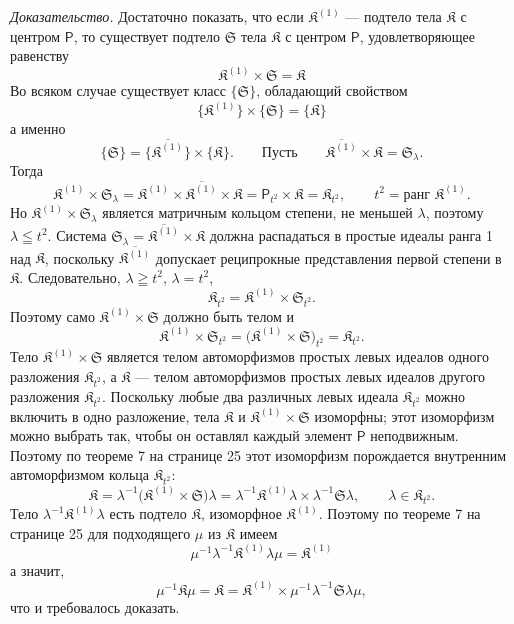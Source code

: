 \documentclass[11pt]{article}
\begin{document}
\emph{Доказательство.} Достаточно показать, что если \(\mathfrak K^{(1)}\) --- подтело тела \(\mathfrak K\) с центром \(\mathsf P\), то существует подтело \(\mathfrak S\) тела \(\mathfrak K\) с центром \(\mathsf P\), удовлетворяющее равенству
\[
\mathfrak K^{(1)}\times\mathfrak S=\mathfrak K
\]
Во всяком случае существует класс \(\{\mathfrak S\}\), обладающий свойством
\[
\{\mathfrak K^{(1)}\}\times\{\mathfrak S\}=\{\mathfrak K\}
\]
а именно
\[
\{\mathfrak S\}=\{\overline{\mathfrak K^{(1)}}\}\times\{\mathfrak K\}.
\qquad
\text{Пусть}\qquad
\overline{\mathfrak K^{(1)}}\times\mathfrak K=\mathfrak S_\lambda.
\]
Тогда
\[
\mathfrak K^{(1)}\times\mathfrak S_\lambda
=\mathfrak K^{(1)}\times\overline{\mathfrak K^{(1)}}\times\mathfrak K
=\mathsf P_{t^2}\times\mathfrak K
=\mathfrak K_{t^2},
\qquad
t^2=\text{ранг }\mathfrak K^{(1)}.
\]
Но \(\mathfrak K^{(1)}\times\mathfrak S_\lambda\) является матричным кольцом степени, не меньшей \(\lambda\), поэтому \(\lambda\leqq t^2\). Система \(\mathfrak S_\lambda=\overline{\mathfrak K^{(1)}}\times\mathfrak K\) должна распадаться в простые идеалы ранга 1 над \(\mathfrak K\), поскольку \(\overline{\mathfrak K^{(1)}}\) допускает реципрокные представления первой степени в \(\mathfrak K\). Следовательно, \(\lambda\geqq t^2\), \(\lambda=t^2\),
\[
\mathfrak K_{t^2}=\mathfrak K^{(1)}\times\mathfrak S_{t^2}.
\]
Поэтому само \(\mathfrak K^{(1)}\times\mathfrak S\) должно быть телом и
\[
\mathfrak K^{(1)}\times\mathfrak S_{t^2}
=\bigl(\mathfrak K^{(1)}\times\mathfrak S\bigr)_{t^2}
=\mathfrak K_{t^2}.
\]
Тело \(\mathfrak K^{(1)}\times\mathfrak S\) является телом автоморфизмов простых левых идеалов одного разложения \(\mathfrak K_{t^2}\), а \(\mathfrak K\) --- телом автоморфизмов простых левых идеалов другого разложения \(\mathfrak K_{t^2}\). Поскольку любые два различных левых идеала \(\mathfrak K_{t^2}\) можно включить в одно разложение, тела \(\mathfrak K\) и \(\mathfrak K^{(1)}\times\mathfrak S\) изоморфны; этот изоморфизм можно выбрать так, чтобы он оставлял каждый элемент \(\mathsf P\) неподвижным. Поэтому по теореме 7 на странице 25 этот изоморфизм порождается внутренним автоморфизмом кольца \(\mathfrak K_{t^2}\):
\[
\mathfrak K
=\lambda^{-1}\bigl(\mathfrak K^{(1)}\times\mathfrak S\bigr)\lambda
=\lambda^{-1}\mathfrak K^{(1)}\lambda\times\lambda^{-1}\mathfrak S\lambda,
\qquad
\lambda\in\mathfrak K_{t^2}.
\]
Тело \(\lambda^{-1}\mathfrak K^{(1)}\lambda\) есть подтело \(\mathfrak K\), изоморфное \(\mathfrak K^{(1)}\). Поэтому по теореме 7 на странице 25 для подходящего \(\mu\) из \(\mathfrak K\) имеем
\[
\mu^{-1}\lambda^{-1}\mathfrak K^{(1)}\lambda\mu=\mathfrak K^{(1)}
\]
а значит,
\[
\mu^{-1}\mathfrak K\mu
=\mathfrak K
=\mathfrak K^{(1)}\times\mu^{-1}\lambda^{-1}\mathfrak S\lambda\mu,
\]
что и требовалось доказать.
\end{document}
